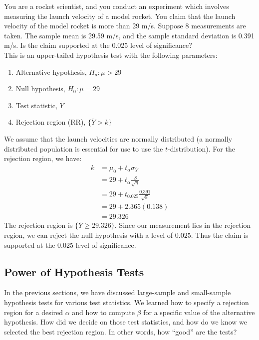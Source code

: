 \documentclass[notes.tex]{subfiles}
\begin{document}
\begin{example}You are a rocket scientist, and you conduct an experiment which involves measuring the launch velocity of a model rocket. You claim that the launch velocity of the model rocket is more than 29 m/s. Suppose 8 measurements are taken. The sample mean is 29.59 m/s, and the sample standard deviation is 0.391 m/s. Is the claim supported at the 0.025 level of significance?\\

This is an upper-tailed hypothesis test with the following parameters:
\begin{enumerate}
\item Alternative hypothesis, $H_a: \mu > 29$
\item Null hypothesis, $H_0: \mu = 29$
\item Test statistic, $\bar{Y}$
\item Rejection region (RR), $\{ \bar{Y} > k \}$
\end{enumerate}
We assume that the launch velocities are normally distributed (a normally distributed population is essential for use to use the $t$-distribution). For the rejection region, we have:
\begin{align*}
k &= \mu_0 + t_\alpha \sigma_{\bar{Y}} \\
&= 29 + t_\alpha \frac{S}{\sqrt{n}} \\
&= 29 + t_{0.025} \frac{0.391}{\sqrt{8}} \\
&= 29 + 2.365 ( 0.138 ) \\
&= 29.326
\end{align*}
The rejection region is $\{\bar{Y} \geq 29.326\}$. Since our measurement lies in the rejection region, we can reject the null hypothesis with a level of $0.025$. Thus the claim is supported at the 0.025 level of significance.
\end{example}

\subsection{Power of Hypothesis Tests}
In the previous sections, we have discussed large-sample and small-sample hypothesis tests for various test statistics. We learned how to specify a rejection region for a desired $\alpha$ and how to compute $\beta$ for a specific value of the alternative hypothesis. How did we decide on those test statistics, and how do we know we selected the best rejection region. In other words, how ``good'' are the tests?\\
\end{document}
